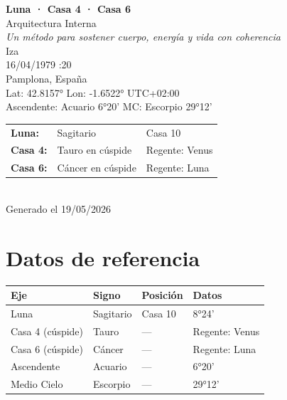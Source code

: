 \documentclass[11pt,a4paper]{article}
\begin{document}
\begin{titlepage}
  \centering
  \vspace*{1.5cm}
  {\Huge\bfseries\color{azulai} Luna · Casa 4 · Casa 6}\\[0.5cm]
  {\large\color{grisai} Arquitectura Interna}\\[0.3cm]
  {\small\itshape\color{grisai} Un método para sostener cuerpo, energía y vida con coherencia}\\[2cm]
  {\huge\color{doradoai} Iza}\\[1.5cm]
  {\Large 16/04/1979 :20}\\[0.3cm]
  {\Large Pamplona, España}\\[0.3cm]
  {\normalsize Lat: 42.8157° \quad Lon: -1.6522° \quad UTC+02:00}\\[0.3cm]
  {\normalsize Ascendente: Acuario 6°20' \quad
    MC: Escorpio 29°12'}\\[2cm]

  \begin{tabular}{lll}
    \textbf{Luna:} & Sagitario & Casa 10 \\
    \textbf{Casa 4:} & Tauro en cúspide & Regente: Venus \\
    \textbf{Casa 6:} & Cáncer en cúspide & Regente: Luna \\
  \end{tabular}\\[2cm]

  \vfill
  {\small Generado el 19/05/2026}
\end{titlepage}

\tableofcontents
\clearpage

\section{Datos de referencia}

\begin{center}
\begin{tabular}{llll}
  \toprule
  \textbf{Eje} & \textbf{Signo} & \textbf{Posición} & \textbf{Datos} \\
  \midrule
  Luna & Sagitario & Casa 10 & 8°24' \\
  Casa 4 (cúspide) & Tauro & --- & Regente: Venus \\
  Casa 6 (cúspide) & Cáncer & --- & Regente: Luna \\
  Ascendente & Acuario & --- & 6°20' \\
  Medio Cielo & Escorpio & --- & 29°12' \\
  \bottomrule
\end{tabular}
\end{center}
\end{document}
